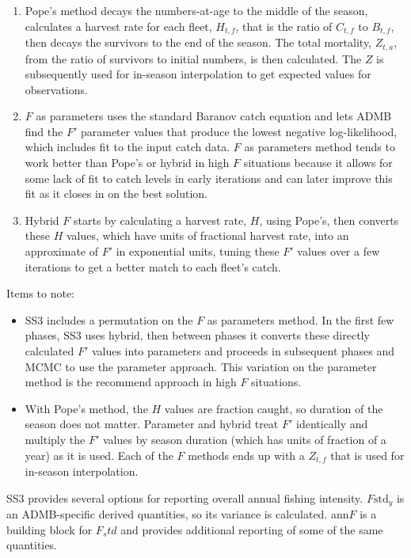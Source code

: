 \begin{enumerate}
	\item Pope's method decays the numbers-at-age to the middle of the season, calculates a harvest rate for each fleet, $H_{t,f}$, that is the ratio of $C_{t,f}$ to $B_{t,f}$, then decays the survivors to the end of the season. The total mortality, $Z_{t,a}$, from the ratio of survivors to initial numbers, is then calculated. The $Z$ is subsequently used for in-season interpolation to get expected values for observations.
	
	\item $F$ as parameters uses the standard Baranov catch equation and lets ADMB find the $F'$ parameter values that produce the lowest negative log-likelihood, which includes fit to the input catch data. $F$ as parameters method tends to work better than Pope's or hybrid in high $F$ situations because it allows for some lack of fit to catch levels in early iterations and can later improve this fit as it closes in on the best solution.
	
	\item Hybrid $F$ starts by calculating a harvest rate, $H$, using Pope's, then converts these $H$ values, which have units of fractional harvest rate, into an approximate of $F'$ in exponential units, tuning these $F'$ values over a few iterations to get a better match to each fleet's catch.
\end{enumerate}

Items to note:
\begin{itemize}
	\item SS3 includes a permutation on the $F$ as parameters method. In the first few phases, SS3 uses hybrid, then between phases it converts these directly calculated $F'$ values into parameters and proceeds in subsequent phases and MCMC to use the parameter approach. This variation on the parameter method is the recommend approach in high $F$ situations.
	
	\item With Pope's method, the $H$ values are fraction caught, so duration of the season does not matter. Parameter and hybrid treat $F'$ identically and multiply the $F'$ values by season duration (which has units of fraction of a year) as it is used. Each of the $F$ methods ends up with a $Z_{t,f}$ that is used for in-season interpolation.
\end{itemize}

SS3 provides several options for reporting overall annual fishing intensity.  $F\text{std}_y$ is an ADMB-specific derived quantities, so its variance is calculated.  ann$F$ is a building block for  $F_std$ and provides additional reporting of some of the same quantities.

